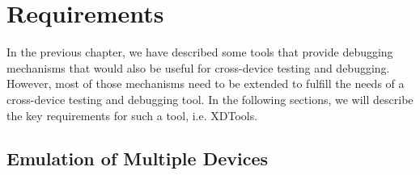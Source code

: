 \chapter{Requirements}

In the previous chapter, we have described some tools that provide debugging mechanisms that would also be useful for cross-device testing and debugging. However, most of those mechanisms need to be extended to fulfill the needs of a cross-device testing and debugging tool. In the following sections, we will describe the key requirements for such a tool, i.e. XDTools.

\section{Emulation of Multiple Devices}

